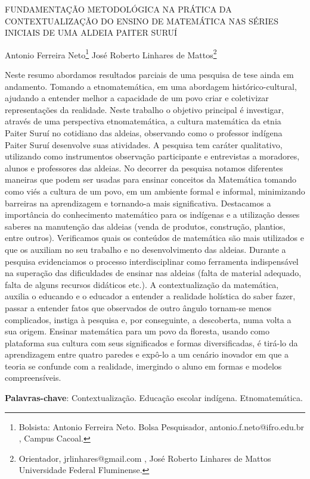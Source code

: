 \documentclass[article,12pt,onesidea,4paper,english,brazil]{abntex2}
\begin{document}
	
	
	\frenchspacing 
	
	\begin{center}
		\LARGE FUNDAMENTAÇÃO METODOLÓGICA NA PRÁTICA DA CONTEXTUALIZAÇÃO
		DO ENSINO DE MATEMÁTICA NAS SÉRIES INICIAIS DE UMA ALDEIA PAITER
		SURUÍ
		
		\normalsize
		Antonio Ferreira Neto\footnote{Bolsista: Antonio Ferreira Neto. Bolsa Pesquisador, antonio.f.neto@ifro.edu.br , Campus Cacoal.} 
		José Roberto Linhares de Mattos\footnote{Orientador, jrlinhares@gmail.com , José Roberto Linhares de Mattos Universidade Federal Fluminense.} 
	\end{center}
	
	\noindent Neste resumo abordamos resultados parciais de uma pesquisa de tese ainda em
	andamento. Tomando a etnomatemática, em uma abordagem histórico-cultural,
	ajudando a entender melhor a capacidade de um povo criar e coletivizar
	representações da realidade. Neste trabalho o objetivo principal é investigar, através
	de uma perspectiva etnomatemática, a cultura matemática da etnia Paiter Suruí no
	cotidiano das aldeias, observando como o professor indígena Paiter Suruí
	desenvolve suas atividades. A pesquisa tem caráter qualitativo, utilizando como
	instrumentos observação participante e entrevistas a moradores, alunos e
	professores das aldeias. No decorrer da pesquisa notamos diferentes maneiras que
	podem ser usadas para ensinar conceitos da Matemática tomando como viés a
	cultura de um povo, em um ambiente formal e informal, minimizando barreiras na
	aprendizagem e tornando-a mais significativa. Destacamos a importância do
	conhecimento matemático para os indígenas e a utilização desses saberes na
	manutenção das aldeias (venda de produtos, construção, plantios, entre outros).
	Verificamos quais os conteúdos de matemática são mais utilizados e que os auxiliam
	no seu trabalho e no desenvolvimento das aldeias. Durante a pesquisa
	evidenciamos o processo interdisciplinar como ferramenta indispensável na
	superação das dificuldades de ensinar nas aldeias (falta de material adequado, falta
	de alguns recursos didáticos etc.). A contextualização da matemática, auxilia o
	educando e o educador a entender a realidade holística do saber fazer, passar a
	entender fatos que observados de outro ângulo tornam-se menos complicados,
	instiga à pesquisa e, por conseguinte, a descoberta, numa volta a sua origem.
	Ensinar matemática para um povo da floresta, usando como plataforma sua cultura
	com seus significados e formas diversificadas, é tirá-lo da aprendizagem entre
	quatro paredes e expô-lo a um cenário inovador em que a teoria se confunde com a
	realidade, imergindo o aluno em formas e modelos compreensíveis.
	
	\vspace{\onelineskip}
	
	\noindent
	\textbf{Palavras-chave}: Contextualização. Educação escolar indígena. Etnomatemática.
	
\end{document}
